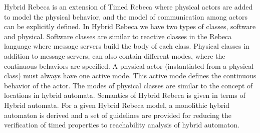 \documentclass[
graybox,
envcountchap
]{svmult}
\begin{document}
\begin{bibunit}
Hybrid Rebeca is an extension of Timed Rebeca where  physical actors are added to model the physical behavior, and the model of communication among actors can be explicitly defined. %
 In Hybrid Rebeca \cite{DBLP:conf/cyphy/JahandidehGS18} we have two types of classes, software and physical. Software classes are similar to reactive classes in the Rebeca language where message servers build the body of each class. Physical classes in addition to message servers, can also contain different modes, where the continuous behaviors are specified. A physical actor (instantiated from a physical class) must always have one active mode. This active mode defines the  continuous behavior of the actor. The modes of physical classes are similar to the concept of locations in hybrid automata. 
Semantics of Hybrid Rebeca is given in terms of Hybrid automata. For a given Hybrid Rebeca model, a monolithic  hybrid automaton is derived and a set of guidelines are provided for  reducing the verification of timed properties to reachability analysis of hybrid automaton. 
%



\end{bibunit}
\end{document}
